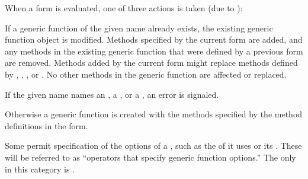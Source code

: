 When a  form is evaluated, one of three actions
is taken (due to ):

\beginlist

\itemitem{\bull} If a generic function of the given name already exists,
the existing generic function object is modified.  Methods specified
by the current  form are added, and any methods in the
existing generic function that were defined by a previous 
form are removed.  Methods added by the current  
form might replace methods defined by , 
, , or .  
No other methods in the generic function are affected
or replaced.

\itemitem{\bull} If the given name names 
    an , 
    a  ,
 or a , 
an error is signaled.

\itemitem{\bull} Otherwise a generic function is created with the
methods specified by the method definitions in the 
form.

\endlist

Some  permit specification of the options of a
, such as 
the  of  it uses 
or its .
These  will be referred to as
``operators that specify generic function options.''
The only   in this category is .

